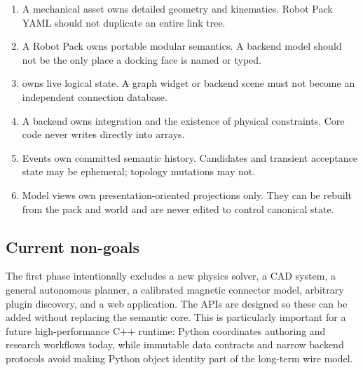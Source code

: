 \begin{enumerate}
  \item A mechanical asset owns detailed geometry and kinematics. Robot Pack YAML
        should not duplicate an entire link tree.
  \item A Robot Pack owns portable modular semantics. A backend model should not be the
        only place a docking face is named or typed.
  \item {} owns live logical state. A graph widget or backend scene must
        not become an independent connection database.
  \item A backend owns integration and the existence of physical constraints. Core
        code never writes directly into \mujoco{} arrays.
  \item Events own committed semantic history. Candidates and transient acceptance
        state may be ephemeral; topology mutations may not.
  \item Model views own presentation-oriented projections only. They can be rebuilt
        from the pack and world and are never edited to control canonical state.
\end{enumerate}

\subsection{Current non-goals}

The first phase intentionally excludes a new physics solver, a CAD system, a general
autonomous planner, a calibrated magnetic connector model, arbitrary plugin discovery,
and a web application. The APIs are designed so these can be added without replacing
the semantic core. This is particularly important for a future high-performance C++
runtime: Python coordinates authoring and research workflows today, while immutable
data contracts and narrow backend protocols avoid making Python object identity part of
the long-term wire model.

